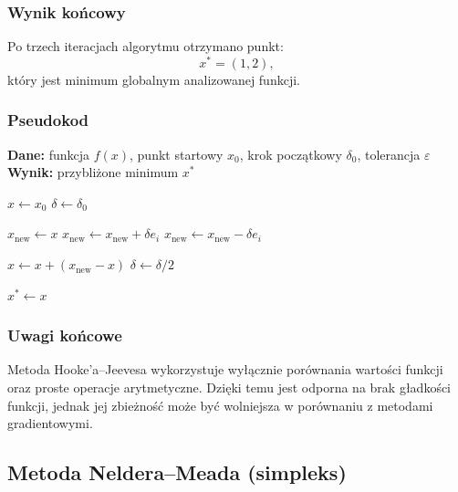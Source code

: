 \documentclass[10pt,a4paper]{article}
\begin{document}
\subsubsection{Wynik końcowy}

Po trzech iteracjach algorytmu otrzymano punkt:
\[
x^* = (1,2),
\]
który jest minimum globalnym analizowanej funkcji.



\subsubsection{Pseudokod}

\begin{algorithm}[H]
\caption{Metoda poszukiwań wzorcowych (Hooke--Jeeves)}
\begin{algorithmic}[1]
\STATE \textbf{Dane:} funkcja $f(x)$, punkt startowy $x_0$, krok początkowy $\delta_0$, tolerancja $\varepsilon$
\STATE \textbf{Wynik:} przybliżone minimum $x^\ast$

\STATE $x \leftarrow x_0$
\STATE $\delta \leftarrow \delta_0$

\WHILE{$\delta > \varepsilon$}
    \STATE $x_{\text{new}} \leftarrow x$
            \STATE $x_{\text{new}} \leftarrow x_{\text{new}} + \delta e_i$
            \STATE $x_{\text{new}} \leftarrow x_{\text{new}} - \delta e_i$
        \ENDIF
    \ENDFOR

        \STATE $x \leftarrow x + (x_{\text{new}} - x)$ 
    \ELSE
        \STATE $\delta \leftarrow \delta / 2$
    \ENDIF
\ENDWHILE

\STATE $x^\ast \leftarrow x$
\end{algorithmic}
\end{algorithm}



\subsubsection{Uwagi końcowe}

Metoda Hooke’a--Jeevesa wykorzystuje wyłącznie porównania wartości funkcji
oraz proste operacje arytmetyczne. Dzięki temu jest odporna na brak gładkości
funkcji, jednak jej zbieżność może być wolniejsza w porównaniu z metodami
gradientowymi.

\subsection{Metoda Neldera--Meada (simpleks)}
\end{document}
